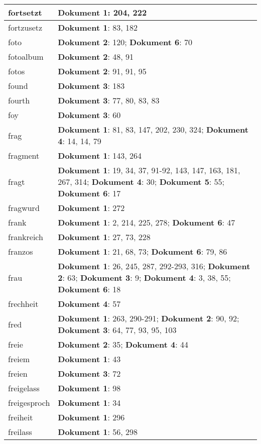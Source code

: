 \documentclass[a5paper]{article}
\begin{document}
\begin{longtable}[l]{|l|p{3in}|}
\hline
fortsetzt & \textbf{Dokument 1}: 204, 222 \\
\hline
fortzusetz & \textbf{Dokument 1}: 83, 182 \\
\hline
foto & \textbf{Dokument 2}: 120; \textbf{Dokument 6}: 70 \\
\hline
fotoalbum & \textbf{Dokument 2}: 48, 91 \\
\hline
fotos & \textbf{Dokument 2}: 91, 91, 95 \\
\hline
found & \textbf{Dokument 3}: 183 \\
\hline
fourth & \textbf{Dokument 3}: 77, 80, 83, 83 \\
\hline
foy & \textbf{Dokument 3}: 60 \\
\hline
frag & \textbf{Dokument 1}: 81, 83, 147, 202, 230, 324; \textbf{Dokument 4}: 14, 14, 79 \\
\hline
fragment & \textbf{Dokument 1}: 143, 264 \\
\hline
fragt & \textbf{Dokument 1}: 19, 34, 37, 91-92, 143, 147, 163, 181, 267, 314; \textbf{Dokument 4}: 30; \textbf{Dokument 5}: 55; \textbf{Dokument 6}: 17 \\
\hline
fragwurd & \textbf{Dokument 1}: 272 \\
\hline
frank & \textbf{Dokument 1}: 2, 214, 225, 278; \textbf{Dokument 6}: 47 \\
\hline
frankreich & \textbf{Dokument 1}: 27, 73, 228 \\
\hline
franzos & \textbf{Dokument 1}: 21, 68, 73; \textbf{Dokument 6}: 79, 86 \\
\hline
frau & \textbf{Dokument 1}: 26, 245, 287, 292-293, 316; \textbf{Dokument 2}: 63; \textbf{Dokument 3}: 9; \textbf{Dokument 4}: 3, 38, 55; \textbf{Dokument 6}: 18 \\
\hline
frechheit & \textbf{Dokument 4}: 57 \\
\hline
fred & \textbf{Dokument 1}: 263, 290-291; \textbf{Dokument 2}: 90, 92; \textbf{Dokument 3}: 64, 77, 93, 95, 103 \\
\hline
freie & \textbf{Dokument 2}: 35; \textbf{Dokument 4}: 44 \\
\hline
freiem & \textbf{Dokument 1}: 43 \\
\hline
freien & \textbf{Dokument 3}: 72 \\
\hline
freigelass & \textbf{Dokument 1}: 98 \\
\hline
freigesproch & \textbf{Dokument 1}: 34 \\
\hline
freiheit & \textbf{Dokument 1}: 296 \\
\hline
freilass & \textbf{Dokument 1}: 56, 298 \\

\end{longtable}
\end{document}
